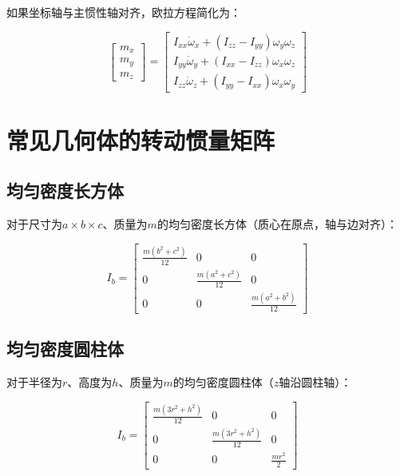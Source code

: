 \documentclass[12pt,a4paper]{article}
\begin{document}
如果坐标轴与主惯性轴对齐，欧拉方程简化为：

\begin{equation}
\begin{bmatrix}
m_x \\
m_y \\
m_z
\end{bmatrix} = \begin{bmatrix}
I_{xx} \dot{\omega}_x + (I_{zz} - I_{yy}) \omega_y \omega_z \\
I_{yy} \dot{\omega}_y + (I_{xx} - I_{zz}) \omega_x \omega_z \\
I_{zz} \dot{\omega}_z + (I_{yy} - I_{xx}) \omega_x \omega_y
\end{bmatrix}
\label{eq:euler_principal}
\end{equation}

\section{常见几何体的转动惯量矩阵}

\subsection{均匀密度长方体}

对于尺寸为$a \times b \times c$、质量为$m$的均匀密度长方体（质心在原点，轴与边对齐）：

\begin{equation}
I_b = \begin{bmatrix}
\frac{m(b^2 + c^2)}{12} & 0 & 0 \\
0 & \frac{m(a^2 + c^2)}{12} & 0 \\
0 & 0 & \frac{m(a^2 + b^2)}{12}
\end{bmatrix}
\end{equation}

\subsection{均匀密度圆柱体}

对于半径为$r$、高度为$h$、质量为$m$的均匀密度圆柱体（$z$轴沿圆柱轴）：

\begin{equation}
I_b = \begin{bmatrix}
\frac{m(3r^2 + h^2)}{12} & 0 & 0 \\
0 & \frac{m(3r^2 + h^2)}{12} & 0 \\
0 & 0 & \frac{mr^2}{2}
\end{bmatrix}
\end{equation}
\end{document}
